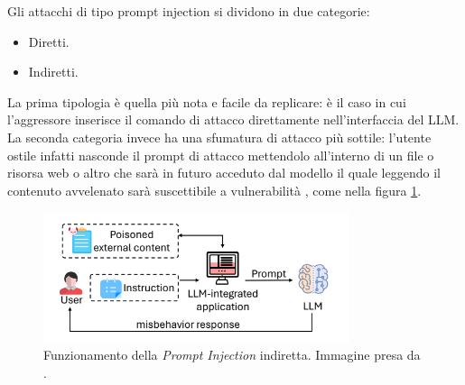 Gli attacchi di tipo prompt injection si dividono in due categorie:
\begin{itemize}
    \item Diretti.
    \item Indiretti.
\end{itemize}
La prima tipologia \`e quella pi\`u nota e facile da replicare: \`e il caso in cui l'aggressore inserisce il comando di attacco direttamente nell'interfaccia del LLM.\\
La seconda categoria invece ha una sfumatura di attacco pi\`u sottile: l'utente ostile infatti nasconde il prompt di attacco mettendolo all'interno di un file o risorsa web o altro che sar\`a in futuro acceduto dal modello il quale leggendo il contenuto avvelenato sar\`a suscettibile a vulnerabilit\`a \cite{ibm2024whatispromptinjectionattack}, come nella figura \ref{fig:indirectPromptInjectionExample}.

\begin{figure}[H]
    \centering
    \includegraphics[width=0.8\textwidth]{media/3-attaccareLLM/indirectPromptInjectionExample.png}
    \caption{Funzionamento della \emph{Prompt Injection} indiretta. Immagine presa da \cite{yi2024benchmarkingdefendingindirectprompt}.}
    \label{fig:indirectPromptInjectionExample}
\end{figure}

